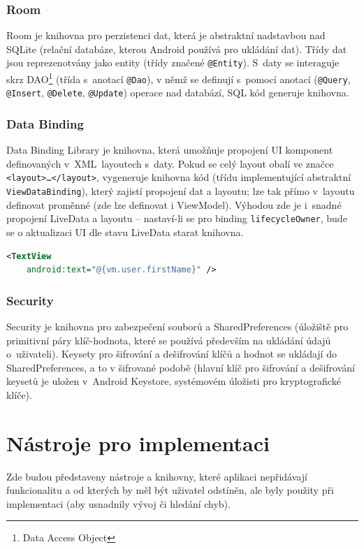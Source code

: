 \documentclass[twoside]{ctuthesis}
\begin{document}
\subsubsection{Room}
Room je knihovna pro perzistenci dat, která je abstraktní nadstavbou nad SQLite (relační databáze, kterou Android používá pro ukládání dat). Třídy dat jsou reprezenotvány jako entity (třídy značené \texttt{@Entity}). S~daty se interaguje skrz DAO\footnote{Data Access Object} (třída s~anotací \texttt{@Dao}), v němž se definují s~pomocí anotací (\texttt{@Query}, \texttt{@Insert}, \texttt{@Delete}, \texttt{@Update}) operace nad databází, SQL kód generuje knihovna. \cite{android2020room}


\subsubsection{Data Binding}
Data Binding Library\cite{android2020data} je knihovna, která umožňuje propojení UI komponent definovaných v~XML~layoutech s~daty. Pokud se celý layout obalí ve značce \texttt{<layout>\ldots</layout>}, vygeneruje knihovna kód (třídu implementující ab\-strakt\-ní \texttt{ViewDataBinding}), který zajistí propojení dat a layoutu; lze tak přímo v~layoutu definovat proměnné (zde lze definovat i ViewModel). Výhodou zde je i~snadné propojení LiveData a layoutu -- nastaví-li se pro binding \texttt{lifecycleOwner}, bude se o aktualizaci UI dle stavu LiveData starat knihovna.

\begin{lstlisting}[language=XML]
<TextView
	android:text="@{vm.user.firstName}"	/>
\end{lstlisting}

\subsubsection{Security}

Security je knihovna pro zabezpečení souborů a SharedPreferences (úložiště pro primitivní páry klíč-hodnota, které se používá především na ukládání údajů o~uživateli). Keysety pro šifrování a dešifrování klíčů a hodnot se ukládají do SharedPreferences, a to v šifrované podobě (hlavní klíč pro šifrování a dešifrování keysetů je uložen v~Android Keystore, systémovém úložisti pro kryptografické klíče). \cite{android2021security}

\section{Nástroje pro implementaci}
Zde budou představeny nástroje a knihovny, které aplikaci nepřidávají funkcionalitu a od kterých by měl být uživatel odstíněn, ale byly použity při implementaci (aby usnadnily vývoj či hledání chyb).
\end{document}
